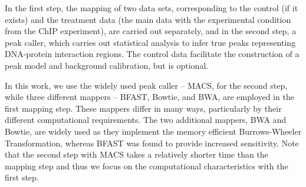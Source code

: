 \documentclass{cpeauth}
\begin{document}

 In the first step, the mapping of two data sets, corresponding to the
 control (if it exists) and the treatment data (the main data with the
 experimental condition from the ChIP experiment), are carried out
 separately, and in the second step, a peak caller, which carries out
 statistical analysis to infer true peaks representing DNA-protein
 interaction regions.  The control data facilitate the construction of
 a peak model and background calibration, but is optional.
 
 
 In this work, we use the widely used peak caller -- MACS\cite{macs},
 for the second step, while three different mappers -- BFAST, Bowtie,
 and BWA, are employed in the first mapping step.  These mappers
 differ in many ways, particularly by their different computational
 requirements.  The two additional mappers, BWA and Bowtie, are widely
 used as they implement the memory efficient Burrows-Wheeler
 Transformation, whereas BFAST was found to provide increased
 sensitivity\cite{bfast2009,mapping-survey}.  Note that the second
 step with MACS takes a relatively shorter time than the mapping step
 and thus we focus on the computational characteristics with the first
 step.
 
\end{document}
